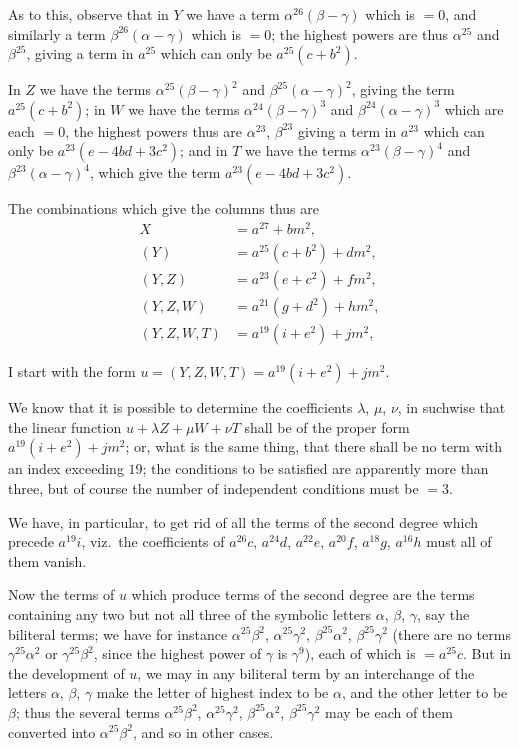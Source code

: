 \documentclass[11pt,a4paper]{article}
\theoremstyle{definition}
\begin{document}
As to this, observe that in $Y$ we have a term $\alpha^{26}(\beta - \gamma)$ which is $= 0$, and similarly a term $\beta^{26}(\alpha - \gamma)$ which is $= 0$; the highest powers are thus $\alpha^{25}$ and $\beta^{25}$, giving a term in $a^{25}$ which can only be $a^{25}(c + b^2)$.

In $Z$ we have the terms $\alpha^{25}(\beta - \gamma)^2$ and $\beta^{25}(\alpha - \gamma)^2$, giving the term $a^{25}(c + b^2)$; in $W$ we have the terms $\alpha^{24}(\beta - \gamma)^3$ and $\beta^{24}(\alpha - \gamma)^3$ which are each $= 0$, the highest powers thus are $\alpha^{23}$, $\beta^{23}$ giving a term in $a^{23}$ which can only be $a^{23}(e - 4bd + 3c^2)$; and in $T$ we have the terms $\alpha^{23}(\beta - \gamma)^4$ and $\beta^{23}(\alpha - \gamma)^4$, which give the term $a^{23}(e - 4bd + 3c^2)$.

The combinations which give the columns thus are
\begin{align*}
X &= a^{27} + bm^2,\\
(Y) &= a^{25}(c + b^2) + dm^2,\\
(Y, Z) &= a^{23}(e + c^2) + fm^2,\\
(Y, Z, W) &= a^{21}(g + d^2) + hm^2,\\
(Y, Z, W, T) &= a^{19}(i + e^2) + jm^2,
\end{align*}

I start with the form $u = (Y, Z, W, T) = a^{19}(i + e^2) + jm^2$.

We know that it is possible to determine the coefficients $\lambda$, $\mu$, $\nu$, in suchwise that the linear function $u + \lambda Z + \mu W + \nu T$ shall be of the proper form $a^{19}(i + e^2) + jm^2$; or, what is the same thing, that there shall be no term with an index exceeding $19$; the conditions to be satisfied are apparently more than three, but of course the number of independent conditions must be $= 3$.

We have, in particular, to get rid of all the terms of the second degree which precede $a^{19}i$, viz.\ the coefficients of $a^{26}c$, $a^{24}d$, $a^{22}e$, $a^{20}f$, $a^{18}g$, $a^{16}h$ must all of them vanish.

Now the terms of $u$ which produce terms of the second degree are the terms containing any two but not all three of the symbolic letters $\alpha$, $\beta$, $\gamma$, say the biliteral terms; we have for instance $\alpha^{25}\beta^2$, $\alpha^{25}\gamma^2$, $\beta^{25}\alpha^2$, $\beta^{25}\gamma^2$ (there are no terms $\gamma^{25}\alpha^2$ or $\gamma^{25}\beta^2$, since the highest power of $\gamma$ is $\gamma^9$), each of which is $= a^{25}c$. But in the development of $u$, we may in any biliteral term by an interchange of the letters $\alpha$, $\beta$, $\gamma$ make the letter of highest index to be $\alpha$, and the other letter to be $\beta$; thus the several terms $\alpha^{25}\beta^2$, $\alpha^{25}\gamma^2$, $\beta^{25}\alpha^2$, $\beta^{25}\gamma^2$ may be each of them converted into $\alpha^{25}\beta^2$, and so in other cases.
\end{document}
